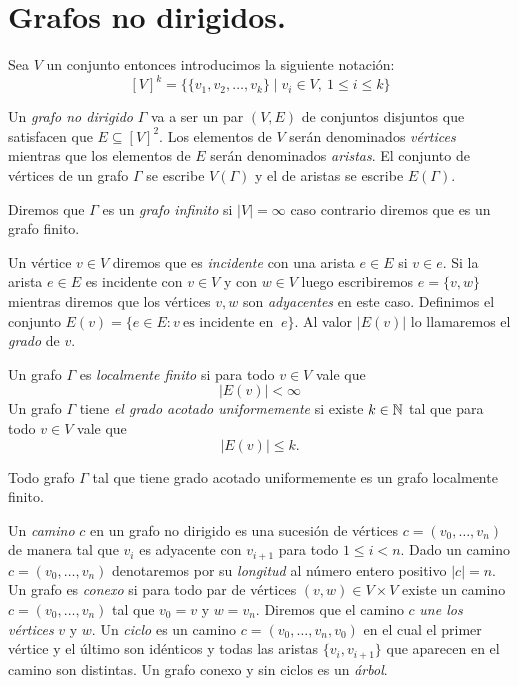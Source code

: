 \documentclass[tesis.tex]{subfiles}
\begin{document}
\section{Grafos no dirigidos.}\label{secc_graf_nd}

Sea $V$ un conjunto entonces introducimos la siguiente notación:
\[
	[V]^k = \{ \{ v_1, v_2, \dots, v_{k} \} \mid v_{i} \in V, \ 1 \le i \le k \}
\]

\begin{deff}
	Un \emph{grafo no dirigido} $\Gamma$ va a ser un par $(V,E)$ de conjuntos disjuntos que satisfacen que
	$E \subseteq [V]^2$.
	Los elementos de $V$ serán denominados \emph{vértices} mientras que los elementos de $E$ serán denominados \emph{aristas}.
	El conjunto de vértices de un grafo $\Gamma$ se escribe $V(\Gamma)$ y el de aristas se escribe $E(\Gamma)$.
\end{deff}


Diremos que $\Gamma$ es un \emph{grafo infinito} si $|V| = \infty$ caso contrario diremos que es un grafo finito.

Un vértice $v \in V$ diremos que es \emph{incidente} con una arista $e \in E$ si $v \in e$.
Si la arista $e \in E$ es incidente con $v \in V$ y con $w \in V$ luego escribiremos $e = \{v,w\}$ mientras diremos que los vértices $v,w$ son \emph{adyacentes} en este caso.
Definimos el conjunto $E(v) = \{  e \in E : v \ \text{es incidente en } \ e \}$.
Al valor $|E(v)|$ lo llamaremos el \emph{grado} de $v$.


\begin{deff}
	Un grafo $\Gamma$ es \emph{localmente finito} si para todo $v \in V$ vale que
	\[
		| E(v) | < \infty
	\]
	Un grafo $\Gamma$ tiene \emph{el grado acotado uniformemente} si existe $k \in \mathbb{N}$ tal que para todo $v \in V$ vale que 
	\[
		|E(v)| \le k.
	\]
\end{deff}
\begin{obs}
	Todo grafo $\Gamma$ tal que tiene grado acotado uniformemente es un grafo localmente finito.
\end{obs}

Un \emph{camino} $c$ en un grafo no dirigido es una sucesión de vértices $c=(v_{0}, \dots, v_{n})$ de manera tal que $v_{i}$ es adyacente con $v_{i+1}$ para todo $1 \le i < n$.
Dado un camino $c = (v_{0}, \dots, v_{n})$ denotaremos por su \emph{longitud} al número entero positivo $|c|= n$.
Un grafo es \emph{conexo} si para todo par de vértices $(v,w) \in V \times V$ existe un camino $c = (v_{0}, \dots, v_{n})$ tal que $v_{0} = v$ y $w=v_{n}$.
Diremos que el camino $c$ \emph{une los vértices} $v$ y $w$.
Un \emph{ciclo} es un camino $c = (v_{0}, \dots, v_{n}, v_{0})$ en el cual el primer vértice y el último son idénticos y todas las aristas $\{ v_{i}, v_{i+1} \}$ que aparecen en el camino son distintas.
Un grafo conexo y sin ciclos es un \emph{árbol}.
\end{document}
